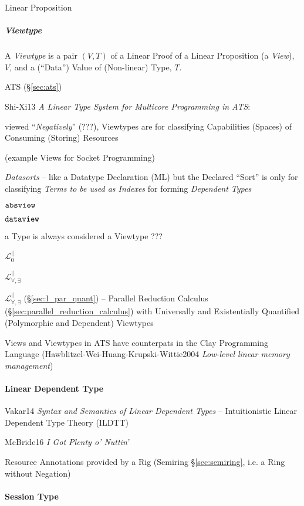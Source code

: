 Linear Proposition



\subparagraph{Viewtype}\label{sec:viewtype}\hfill

A \emph{Viewtype} is a pair $(V,T)$ of a Linear Proof of a Linear
Proposition (a \emph{View}), $V$, and a (``Data'') Value of
(Non-linear) Type, $T$.

ATS (\S\ref{sec:ats})

Shi-Xi13 \emph{A Linear Type System for Multicore Programming in ATS}:

viewed ``\emph{Negatively}'' (???), Viewtypes are for classifying
Capabilities (Spaces) of Consuming (Storing) Resources %

(example Views for Socket Programming) %

\emph{Datasorts} -- like a Datatype Declaration (ML) but the Declared
``Sort'' is only for classifying \emph{Terms to be used as Indexes}
for forming \emph{Dependent Types}

$\mathtt{absview}$

$\mathtt{dataview}$

a Type is always considered a Viewtype ??? %

$\mathcal{L}^\parallel_0$

$\mathcal{L}^\parallel_{\forall, \exists}$

\fist $\mathcal{L}^\parallel_{\forall,\exists}$
(\S\ref{sec:l_par_quant}) -- Parallel Reduction Calculus
(\S\ref{sec:parallel_reduction_calculus}) with Universally and
Existentially Quantified (Polymorphic and Dependent) Viewtypes

Views and Viewtypes in ATS have counterpats in the Clay Programming
Language (Hawblitzel-Wei-Huang-Krupski-Wittie2004 \emph{Low-level
  linear memory management})



\paragraph{Linear Dependent Type}\label{sec:dependent_linear}\hfill

Vakar14 \emph{Syntax and Semantics of Linear Dependent Types} --
Intuitionistic Linear Dependent Type Theory (ILDTT)

McBride16 \emph{I Got Plenty o' Nuttin'}

Resource Annotations provided by a Rig (Semiring \S\ref{sec:semiring},
i.e. a Ring without Negation)



\paragraph{Session Type}\label{sec:session_type}\hfill

